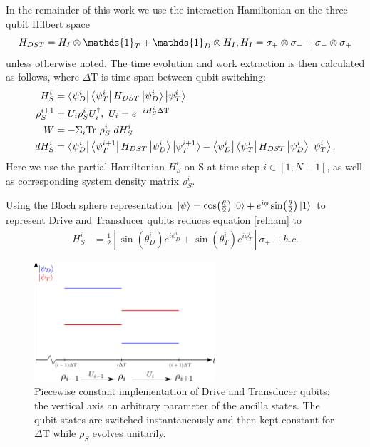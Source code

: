 In the remainder of this work we use the interaction Hamiltonian on the three qubit Hilbert space
\begin{equation*}
H_{DST} = H_{I} \otimes \mathds{1}_T + \mathds{1}_D \otimes H_{I}, \\
H_{I} = \sigma_{+} \otimes \sigma_{-} + \sigma_{-} \otimes \sigma_{+}
\end{equation*}
unless otherwise noted.
The time evolution and work extraction is then calculated as follows, where $\Delta \mathrm{T}$ is time span between qubit switching:
\begin{align}
H_S^i &= \bra{\psi_D^i}\bra{\psi_T^i} H_{DST} \ket{\psi_D^i} \ket{\psi_T^i} \label{relham}\\
\rho_S^{i+1} &= U_i \rho_S^i U^{\dagger}_i, \ U_i = e^{-iH_S^i \Delta \mathrm{T}} \\
W &= - \Sigma_i \mathrm{Tr} \ \rho_S^i \ dH_S^i \\
dH_S^i &= \bra{\psi_D^i}\bra{\psi_T^{i+1}} H_{DST} \ket{\psi_D^i} \ket{\psi_T^{i+1}} - \bra{\psi_D^i}\bra{\psi_T^i} H_{DST} \ket{\psi_D^i} \ket{\psi_T^i}.	
\end{align}
Here we use the partial Hamiltonian $H_S^i$ on S at time step $i \in [1, N - 1]$, as well as corresponding system density matrix $\rho_S^i$.

Using the Bloch sphere representation $\ket{\psi} = \cos(\frac{\theta}{2}) \ket{0} + e^{i \phi} \sin(\frac{\theta}{2})\ket{1}$ to represent Drive and Transducer qubits reduces equation \ref{relham} to
\begin{align}
	H_S^i &= \frac{1}{2} \left[\sin(\theta_D^i) e^{i\phi_D^i} + \sin(\theta_T^i) e^{i\phi_T^i}\right] \sigma_{+} + h.c.
\end{align}

\begin{figure}
	\centering
	\includegraphics[width=0.6\textwidth]{img/pwc}
	\caption{Piecewise constant implementation of Drive and Transducer qubits: the vertical axis an arbitrary parameter of the ancilla states. The qubit states are switched instantaneously and then kept constant for $\Delta \mathrm{T}$ while $\rho_S$ evolves unitarily.}
	\label{pwc}
\end{figure}

